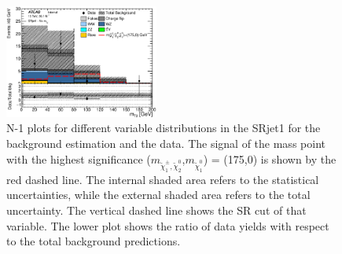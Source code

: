 \begin{figure}[htbp]
\includegraphics[width=0.45\textwidth]{data/plot/PlotsN1/all_Mt2_SRjet1_NoMt2.eps}
\caption{N-1 plots for different variable distributions in the SRjet1 for the background estimation and the data. The signal of the mass point with the highest significance ($m_{\tilde{\chi}_1^\pm , \tilde{\chi}_2^0}$,$m_{\tilde{\chi}_1^0}$) = (175,0) is shown by the red dashed line. The internal shaded area refers to the statistical uncertainties, while the external shaded area refers to the total uncertainty. The vertical dashed line shows the SR cut of that variable. The lower plot shows the ratio of data yields with respect to the total background predictions.}
\label{fig:result_Nminus1_1}
\end{figure}


